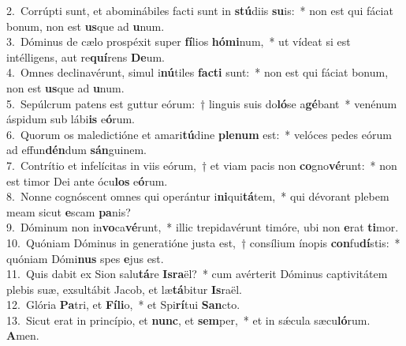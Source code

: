 {2.~}Corrúpti sunt, et abominábiles facti sunt in \textbf{stú}diis \textbf{su}is:~* non est qui fáciat bonum, non est \textbf{us}que ad \textbf{u}num.\\
{3.~}Dóminus de cælo prospéxit super \textbf{fí}lios \textbf{hó}\textbf{mi}num,~* ut vídeat si est intélligens, aut re\textbf{quí}rens \textbf{De}um.\\
{4.~}Omnes declinavérunt, simul i\textbf{nú}tiles \textbf{fa}\textbf{cti} sunt:~* non est qui fáciat bonum, non est \textbf{us}que ad \textbf{u}num.\\
{5.~}Sepúlcrum patens est guttur eórum:~† linguis suis do\textbf{ló}se a\textbf{gé}bant~* venénum áspidum sub lábi\textbf{is} e\textbf{ó}rum.\\
{6.~}Quorum os maledictióne et amari\textbf{tú}dine \textbf{ple}\textbf{num} est:~* velóces pedes eórum ad effun\textbf{dén}dum \textbf{sán}guinem.\\
{7.~}Contrítio et infelícitas in viis eórum,~† et viam pacis non \textbf{co}gno\textbf{vé}runt:~* non est timor Dei ante ócu\textbf{los} e\textbf{ó}rum.\\
{8.~}Nonne cognóscent omnes qui operántur i\textbf{ni}qui\textbf{tá}tem,~* qui dévorant plebem meam sicut \textbf{e}scam \textbf{pa}nis?\\
{9.~}Dóminum non in\textbf{vo}ca\textbf{vé}runt,~* illic trepidavérunt timóre, ubi non \textbf{e}rat \textbf{ti}mor.\\
{10.~}Quóniam Dóminus in generatióne justa est,~† consílium ínopis \textbf{con}fu\textbf{dí}stis:~* quóniam Dómi\textbf{nus} spes \textbf{e}jus est.\\
{11.~}Quis dabit ex Sion salu\textbf{tá}re \textbf{Is}\textbf{ra}ël?~* cum avérterit Dóminus captivitátem plebis suæ, exsultábit Jacob, et læ\textbf{tá}bitur \textbf{Is}raël.\\
{12.~}Glória \textbf{Pa}tri, et \textbf{Fí}\textbf{li}o,~* et Spi\textbf{rí}tui \textbf{San}cto.\\
{13.~}Sicut erat in princípio, et \textbf{nunc}, et \textbf{sem}per,~* et in sǽcula sæcu\textbf{ló}rum. \textbf{A}men.\\
